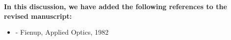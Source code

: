 \documentclass[12pt]{article}
\newenvironment{finished_ourresponse}
    {\begin{tcolorbox}[width=\linewidth,breakable,enhanced,colback=gray!5,colframe=finished_responsecolor!50,title=Response,left=5pt,right=5pt]}
    {\end{tcolorbox}}
\begin{document}
\begin{finished_ourresponse}
    \textbf{In this discussion, we have added the following references to the revised manuscript:}
    \begin{itemize}[nosep]
    \item \cite{fienup1982phase} - Fienup, Applied Optics, 1982
    \end{itemize}

\end{finished_ourresponse}




\end{document}
